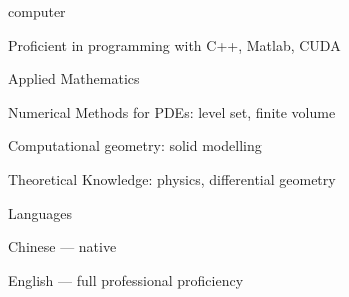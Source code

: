 
\begin{cvskills}
  \cvskill
    {computer} %
    {
      \begin{cvitems} %
        \item {Proficient in programming with C++, Matlab, CUDA}
      \end{cvitems}
    } %

    \cvskill
    {Applied Mathematics} %
    {
      \begin{cvitems} %
        \item {Numerical Methods for PDEs: level set, finite volume}
        \item {Computational geometry: solid modelling}
        \item {Theoretical Knowledge: physics, differential geometry}
      \end{cvitems}
    } %
    
  \cvskill
    {Languages} %
    {
      \begin{cvitems} %
        \item {Chinese --- native}
        \item {English --- full professional proficiency}
      \end{cvitems}
    } %
\end{cvskills}

